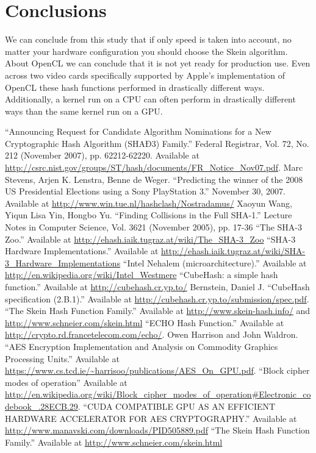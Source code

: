 \documentclass{article}
\begin{document}
\section*{Conclusions}

We can conclude from this study that if only speed is taken into account, no matter your hardware configuration you should choose the Skein algorithm.
About OpenCL we can conclude that it is not yet ready for production use.
Even across two video cards specifically supported by Apple's implementation of OpenCL these hash functions performed in drastically different ways.
Additionally, a kernel run on a CPU can often perform in drastically different ways than the same kernel run on a GPU.



\begin{thebibliography}{9}
   ``Announcing Request for Candidate Algorithm Nominations for a New Cryptographic Hash Algorithm (SHAÐ3) Family.'' Federal Registrar, Vol. 72, No. 212 (November 2007), pp. 62212-62220. Available at \url{http://csrc.nist.gov/groups/ST/hash/documents/FR_Notice_Nov07.pdf}.
   Marc Stevens, Arjen K. Lenstra, Benne de Weger. ``Predicting the winner of the 2008 US Presidential Elections using a Sony PlayStation 3.'' November 30, 2007. Available at \url{http://www.win.tue.nl/hashclash/Nostradamus/}
   Xaoyun Wang, Yiqun Lisa Yin, Hongbo Yu. ``Finding Collisions in the Full SHA-1.'' Lecture Notes in Computer Science, Vol. 3621 (November 2005), pp. 17-36
   ``The SHA-3 Zoo.'' Available at \url{http://ehash.iaik.tugraz.at/wiki/The_SHA-3_Zoo}
   ``SHA-3 Hardware Implementations.'' Available at \url{http://ehash.iaik.tugraz.at/wiki/SHA-3_Hardware_Implementations}
   ``Intel Nehalem (microarchitecture).'' Available at \url{http://en.wikipedia.org/wiki/Intel_Westmere}
   ``CubeHash: a simple hash function.'' Available at \url{http://cubehash.cr.yp.to/}
   Bernstein, Daniel J. ``CubeHash specification (2.B.1).'' Available at \url{http://cubehash.cr.yp.to/submission/spec.pdf}.
   ``The Skein Hash Function Family.'' Available at \url{http://www.skein-hash.info/} and \url{http://www.schneier.com/skein.html}
   ``ECHO Hash Function.'' Available at \url{http://crypto.rd.francetelecom.com/echo/}.
   Owen Harrison and John Waldron. ``AES Encryption Implementation and Analysis on Commodity Graphics Processing Units.'' Available at \url{https://www.cs.tcd.ie/~harrisoo/publications/AES_On_GPU.pdf}.
   ``Block cipher modes of operation'' Available at \url{http://en.wikipedia.org/wiki/Block_cipher_modes_of_operation#Electronic_codebook_.28ECB.29}.
   ``CUDA COMPATIBLE GPU AS AN EFFICIENT HARDWARE ACCELERATOR FOR AES CRYPTOGRAPHY.'' Available at \url{http://www.manavski.com/downloads/PID505889.pdf}
   ``The Skein Hash Function Family.'' Available at \url{http://www.schneier.com/skein.html}
\end{thebibliography}
\end{document}
